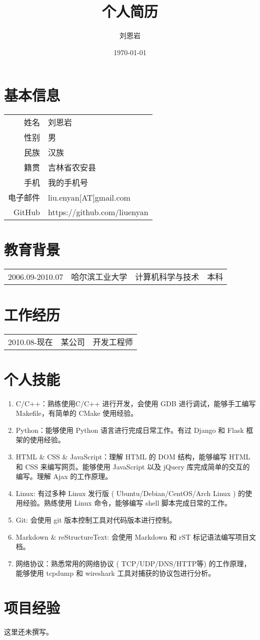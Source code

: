 \documentclass[a4paper, UTF8]{ctexart}
\title{个人简历}
\author{刘恩岩}
\date{\today}
\begin{document}
\section{基本信息}

\begin{tabular}{r@{：}l}
    姓名 & 刘恩岩 \\
    性别 & 男 \\
    民族 & 汉族 \\
    籍贯 & 吉林省农安县 \\
    手机 & 我的手机号 \\
    电子邮件 & liu.enyan[AT]gmail.com \\
    GitHub & https://github.com/liuenyan \\
\end{tabular}

\section{教育背景}

\begin{tabular}{cccc}
    2006.09-2010.07 & 哈尔滨工业大学 & 计算机科学与技术 & 本科 \\ 
\end{tabular}

\section{工作经历}
\begin{tabular}{ccc}
    2010.08-现在 & 某公司 & 开发工程师
\end{tabular}

\section{个人技能}
\begin{enumerate}
\item C/C++：熟练使用C/C++ 进行开发，会使用 GDB 进行调试，能够手工编写 Makefile，有简单的 CMake 使用经验。
\item Python：能够使用 Python 语言进行完成日常工作。有过 Django 和 Flask 框架的使用经验。
\item HTML \& CSS \& JavaScript：理解 HTML 的 DOM 结构，能够编写 HTML 和 CSS 来编写网页。能够使用 JavaScript 以及 jQuery 库完成简单的交互的编写。理解 Ajax 的工作原理。
\item Linux: 有过多种 Linux 发行版 ( Ubuntu/Debian/CentOS/Arch Linux ) 的使用经验。熟练使用 Linux 命令，能够编写 shell 脚本完成日常的工作。
\item Git: 会使用 git 版本控制工具对代码版本进行控制。
\item Markdown \& reStructureText: 会使用 Markdown 和 rST 标记语法编写项目文档。
\item 网络协议：熟悉常用的网络协议 ( TCP/UDP/DNS/HTTP等) 的工作原理，能够使用 tcpdump 和 wireshark 工具对捕获的协议包进行分析。
\end{enumerate}

\section{项目经验}
这里还未撰写。
\end{document}
